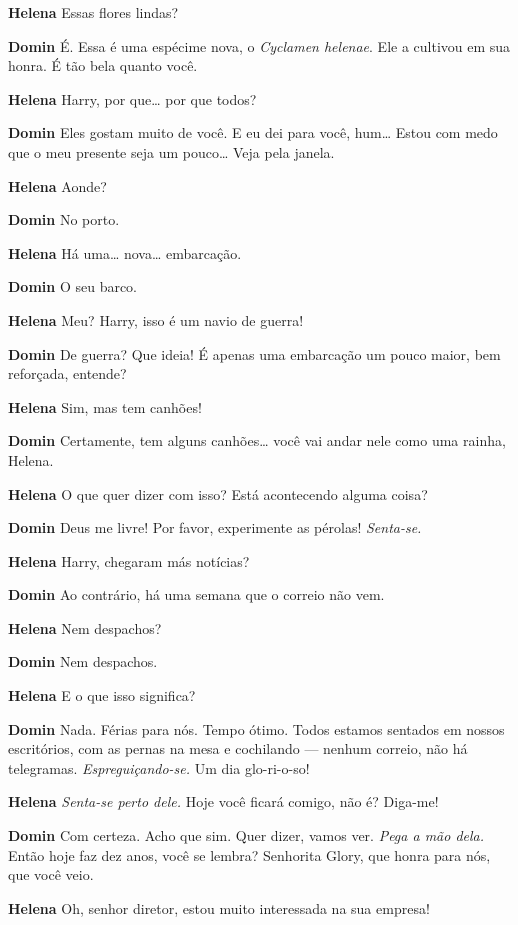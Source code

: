 \textbf{Helena} Essas flores lindas?

\textbf{Domin} É. Essa é uma espécime nova, o \textit{Cyclamen helenae}. Ele a cultivou em sua
honra. É tão bela quanto você.

\textbf{Helena} Harry, por que\ldots{} por que todos?

\textbf{Domin} Eles gostam muito de você. E eu dei para você, hum\ldots{} Estou com medo que o
meu presente seja um pouco\ldots{} Veja pela janela.

\textbf{Helena} Aonde?

\textbf{Domin} No porto.

\textbf{Helena} Há uma\ldots{} nova\ldots{} embarcação.

\textbf{Domin} O seu barco.

\textbf{Helena} Meu? Harry, isso é um navio de guerra!

\textbf{Domin} De guerra? Que ideia! É apenas uma embarcação um pouco maior, bem reforçada, entende?

\textbf{Helena} Sim, mas tem canhões!

\textbf{Domin} Certamente, tem alguns canhões\ldots{} você vai andar nele como uma rainha,
Helena.

\textbf{Helena} O que quer dizer com isso? Está acontecendo alguma coisa?

\textbf{Domin} Deus me livre! Por favor, experimente as pérolas! \emph{Senta-se.}

\textbf{Helena} Harry, chegaram más notícias?

\textbf{Domin} Ao contrário, há uma semana que o correio não vem.

\textbf{Helena} Nem despachos?

\textbf{Domin} Nem despachos.

\textbf{Helena} E o que isso significa?

\textbf{Domin} Nada. Férias para nós. Tempo ótimo. Todos estamos sentados em nossos
escritórios, com as pernas na mesa e cochilando --- nenhum correio, não há
telegramas. \emph{Espreguiçando-se.} Um dia glo-ri-o-so!

\textbf{Helena} \emph{Senta-se perto dele.} Hoje você ficará comigo, não é? Diga-me!

\textbf{Domin} Com certeza. Acho que sim. Quer dizer, vamos ver. \emph{Pega a
mão dela.} Então hoje faz dez anos, você se lembra? Senhorita Glory, que honra
para nós, que você veio.

\textbf{Helena} Oh, senhor diretor, estou muito interessada na sua empresa!

